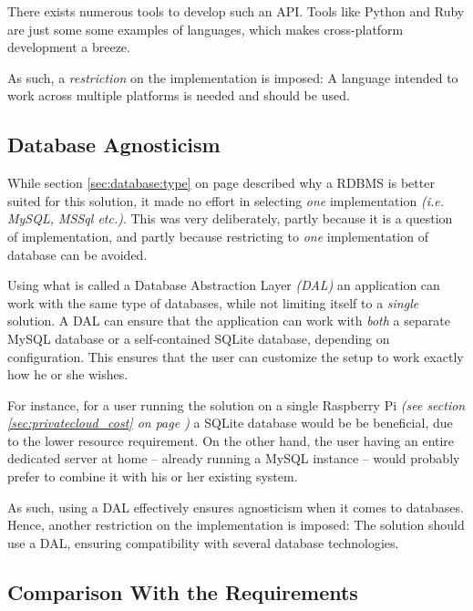			There exists numerous tools to develop such an API. Tools like Python and Ruby are just some some examples of languages, which makes cross-platform development a breeze.

			As such, a \emph{restriction} on the implementation is imposed: A language intended to work across multiple platforms is needed and should be used.

		\subsection{Database Agnosticism}
			\label{sec:restrict:database}
			While section \ref{sec:database:type} on page \pageref{sec:database:type} described why a RDBMS is better suited for this solution, it made no effort in selecting \emph{one} implementation \emph{(i.e. MySQL, MSSql etc.)}. This was very deliberately, partly because it is a question of implementation, and partly because restricting to \emph{one} implementation of database can be avoided.

			Using what is called a Database Abstraction Layer \emph{(DAL)} an application can work with the same type of databases, while not limiting itself to a \emph{single} solution. A DAL can ensure that the application can work with \emph{both} a separate MySQL database or a self-contained SQLite database, depending on configuration. This ensures that the user can customize the setup to work exactly how he or she wishes. 

			For instance, for a user running the solution on a single Raspberry Pi \emph{(see section \ref{sec:privatecloud_cost} on page \pageref{sec:privatecloud_cost})} a SQLite database would be be beneficial, due to the lower resource requirement. On the other hand, the user having an entire dedicated server at home -- already running a MySQL instance -- would probably prefer to combine it with his or her existing system.

			As such, using a DAL effectively ensures agnosticism when it comes to databases. Hence, another restriction on the implementation is imposed: The solution should use a DAL, ensuring compatibility with several database technologies.	

		\subsection{Comparison With the Requirements}
			\label{requirement:fulfilled:database}
			\label{requirement:fulfilled:platform}

